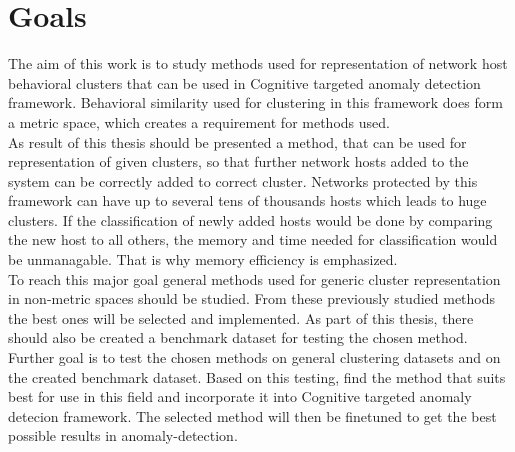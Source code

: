 \documentclass[thesis=B,english]{FITthesis}[2012/10/20]
\begin{document}
%

\chapter{Goals}
The aim of this work is to study methods used for representation of network host behavioral clusters that can be used in Cognitive targeted anomaly detection framework.
Behavioral similarity used for clustering in this framework does form a metric space, which creates a requirement for methods used.
\\
As result of this thesis should be presented a method, that can be used for representation of given clusters, so that further network hosts added to the system can be correctly added to correct cluster.
Networks protected by this framework can have up to several tens of thousands hosts which leads to huge clusters.
If the classification of newly added hosts would be done by comparing the new host to all others, the memory and time needed for classification would be unmanagable.
That is why memory efficiency is emphasized.
\\
To reach this major goal general methods used for generic cluster representation in non-metric spaces should be studied.
From these previously studied methods the best ones  will be selected and implemented.
As part of this thesis, there should also be created a benchmark dataset for testing the chosen method.
Further goal is to test the chosen methods on general clustering datasets and on the created benchmark dataset.
Based on this testing, find the method that suits best for use in this field and incorporate it into Cognitive targeted anomaly detecion framework.
The selected method will then be finetuned to get the best possible results in anomaly-detection.
\end{document}
